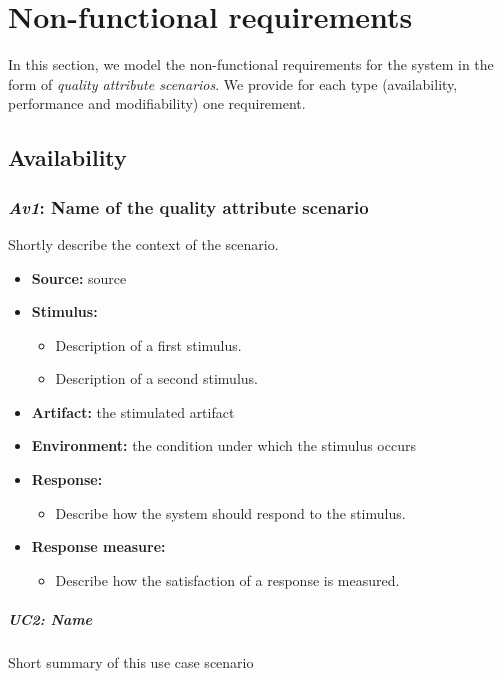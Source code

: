\documentclass[english]{sareport}
\begin{document}
\chapter{Non-functional requirements}\label{sec:non-functional}
In this section, we model the non-functional requirements for the system in the
form of \emph{quality attribute scenarios}. We provide for each type
(availability, performance and modifiability) one requirement.

\section{Availability}
\subsection{\emph{Av1}: Name of the quality attribute scenario}
Shortly describe the context of the scenario.

\begin{itemize}
    \item \textbf{Source:} source
    \item \textbf{Stimulus:}
        \begin{itemize}
            \item Description of a first stimulus.
            \item Description of a second stimulus.
        \end{itemize}

    \item \textbf{Artifact:} the stimulated artifact
    \item \textbf{Environment:} the condition under which the stimulus occurs
    \item \textbf{Response:}
        \begin{itemize}
            \item Describe how the system should respond to the stimulus.
        \end{itemize}

    \item \textbf{Response measure:}
        \begin{itemize}
            \item Describe how the satisfaction of a response is measured.
        \end{itemize}
\end{itemize}

\paragraph{UC2: Name}
Short summary of this use case scenario
\end{document}
